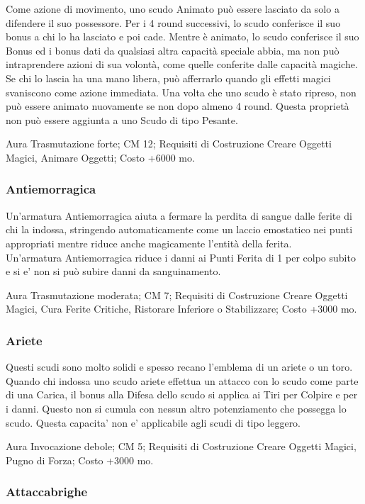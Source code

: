 \begin{multicols}{2}
Come azione di movimento, uno scudo Animato può essere lasciato da solo a difendere il suo possessore. Per i 4 round successivi, lo scudo conferisce il suo bonus a chi lo ha lasciato e poi cade. Mentre è animato, lo scudo conferisce il suo Bonus ed i bonus dati da qualsiasi altra capacità speciale abbia, ma non può intraprendere azioni di sua volontà, come quelle conferite dalle capacità magiche.
Se chi lo lascia ha una mano libera, può afferrarlo quando gli effetti magici svaniscono come azione immediata. Una volta che uno scudo è stato ripreso, non può essere animato nuovamente se non dopo almeno 4 round. Questa proprietà non può essere aggiunta a uno Scudo di tipo Pesante.

Aura Trasmutazione forte; CM 12; Requisiti di Costruzione Creare Oggetti Magici, Animare Oggetti; Costo +6000 mo.

\subsubsection{Antiemorragica}

Un'armatura Antiemorragica aiuta a fermare la perdita di sangue dalle ferite di chi la indossa, stringendo automaticamente come un laccio emostatico nei punti appropriati mentre riduce anche magicamente l'entità della ferita.\\
Un'armatura Antiemorragica riduce i danni ai Punti Ferita di 1 per colpo subito e si e' non si può subire danni da sanguinamento. 

Aura Trasmutazione moderata; CM 7; Requisiti di Costruzione Creare Oggetti Magici, Cura Ferite Critiche, Ristorare Inferiore o Stabilizzare; Costo +3000 mo.

\subsubsection{Ariete}

Questi scudi sono molto solidi e spesso recano l'emblema di un ariete o un toro. Quando chi indossa uno scudo ariete effettua un attacco con lo scudo come parte di una Carica, il bonus alla Difesa dello scudo si applica ai Tiri per Colpire e per i danni. Questo non si cumula con nessun altro potenziamento che possegga lo scudo. Questa capacita' non e' applicabile agli scudi di tipo leggero.

Aura Invocazione debole; CM 5; Requisiti di Costruzione Creare Oggetti Magici, Pugno di Forza; Costo +3000 mo.


\subsubsection{Attaccabrighe}


\end{multicols}
